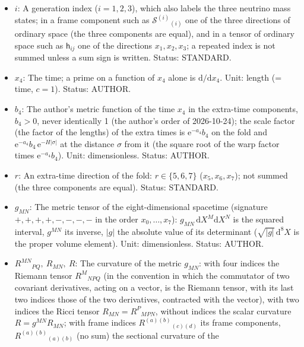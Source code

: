 \documentclass[
  10pt,
]{article}
\begin{document}
\begin{itemize}
  \(x = (x_1, x_2, x_3, x_4)\), and
  \(\mathrm{d}^4x = \mathrm{d}x_1\,\mathrm{d}x_2\,\mathrm{d}x_3\,\mathrm{d}x_4\).
  Unit: length (each coordinate). Status: AUTHOR.
\item
  \(i\): A generation index (\(i = 1, 2, 3\)), which also labels the
  three neutrino mass states; in a frame component such as
  \(\mathcal{S}^{(i)}{}_{(i)}\) one of the three directions of ordinary
  space (the three components are equal), and in a tensor of ordinary
  space such as \(\mathsf{h}_{ij}\) one of the directions
  \(x_1, x_2, x_3\); a repeated index is not summed unless a sum sign is
  written. Status: STANDARD.
\item
  \(x_4\): The time; a prime on a function of \(x_4\) alone is
  \(\mathrm{d}/\mathrm{d}x_4\). Unit: length (= time, \(c = 1\)).
  Status: AUTHOR.
\item
  \(b_4\): The author's metric function of the time \(x_4\) in the
  extra-time components, \(b_4 > 0\), never identically 1 (the author's
  order of 2026-10-24); the scale factor (the factor of the lengths) of
  the extra times is \(\mathrm{e}^{-a_4}b_4\) on the fold and
  \(\mathrm{e}^{-a_4}b_4\,\mathrm{e}^{-H\lvert\sigma\rvert}\) at the
  distance \(\sigma\) from it (the square root of the warp factor times
  \(\mathrm{e}^{-a_4}b_4\)). Unit: dimensionless. Status: AUTHOR.
\item
  \(r\): An extra-time direction of the fold: \(r \in \{5, 6, 7\}\)
  (\(x_5, x_6, x_7\)); not summed (the three components are equal).
  Status: STANDARD.
\item
  \(g_{MN}\): The metric tensor of the eight-dimensional spacetime
  (signature \(+,+,+,+,-,-,-,-\) in the order \(x_0, \dots, x_7\)):
  \(g_{MN}\,\mathrm{d}X^M\mathrm{d}X^N\) is the squared interval,
  \(g^{MN}\) its inverse, \(\lvert g\rvert\) the absolute value of its
  determinant (\(\sqrt{\lvert g\rvert}\,\mathrm{d}^8X\) is the proper
  volume element). Unit: dimensionless. Status: AUTHOR.
\item
  \(R^{MN}{}_{PQ},\ R_{MN},\ R\): The curvature of the metric
  \(g_{MN}\): with four indices the Riemann tensor \(R^M{}_{NPQ}\) (in
  the convention in which the commutator of two covariant derivatives,
  acting on a vector, is the Riemann tensor, with its last two indices
  those of the two derivatives, contracted with the vector), with two
  indices the Ricci tensor \(R_{MN} = R^P{}_{MPN}\), without indices the
  scalar curvature \(R = g^{MN}R_{MN}\); with frame indices
  \(R^{(a)(b)}{}_{(c)(d)}\) its frame components,
  \(R^{(a)(b)}{}_{(a)(b)}\) (no sum) the sectional curvature of the

\end{itemize}
\end{document}
